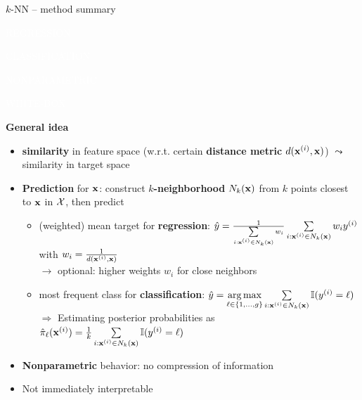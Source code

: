 \documentclass[11pt,compress,t,notes=noshow, xcolor=table]{beamer}
\newcommand{\highlight}[1]{\textcolor{hlcol}{\textbf{#1}}}
\newcommand{\maketag}[2][100]{
  \colorbox{hlcol!#1}{\textcolor{white}{\MakeUppercase{\scriptsize #2}} 
  \vphantom{}}
}
\begin{document}
\begin{frame2}{$k$-NN -- method summary}

  \maketag{regression} \maketag{classification}
  \maketag{Nonparametric} \maketag[50]{White-box}

  \highlight{General idea}
  \begin{itemize}
    \item \textbf{similarity} in feature space (w.r.t. certain \textbf{distance metric} $d(\mathbf{x}^{(i)},\mathbf{x})$) $\leadsto$ similarity in target space 
    \item \textbf{Prediction} for $\mathbf{x}$: construct \textbf{$k$-neighborhood} 
    $N_k(\mathbf{x})$ from $k$ points closest to $\mathbf{x}$ in $\mathcal{X}$, then 
    predict
    \begin{itemize}
      \footnotesize
      \item (weighted) mean target for \textbf{regression}: 
      $\hat{y} = \tfrac{1}{\sum\limits_{i: \mathbf{x}^{(i)} \in N_k(\mathbf{x})} w_i}  
      \sum\limits_{i: \mathbf{x}^{(i)} \in N_k(\mathbf{x})} w_i y^{(i)} $ with $w_i = \tfrac{1}{d(\mathbf{x}^{(i)},\mathbf{x})}$\\
      $\rightarrow$ optional: higher weights $w_i$ for close neighbors
      \item most frequent class for \textbf{classification}: 
      $\hat{y} = \underset{\ell \in \{1, \ldots, g\}}{\mathrm{\mathop{\mathrm{arg\,max}}}} \sum\limits_{i: \mathbf{x}^{(i)} \in N_k(\mathbf{x})} \mathbb{I}(y^{(i)} = \ell)$\\
      $\Rightarrow$ Estimating posterior probabilities as $\hat{\pi}_{\ell}(\mathbf{x}^{(i)})= \frac{1}{k} \sum\limits_{i: \mathbf{x}^{(i)} \in N_k(\mathbf{x})} \mathbb{I}(y^{(i)} = \ell)$
    \end{itemize}
    \item \textbf{Nonparametric} behavior: no 
    compression of information
    \item Not immediately interpretable
  \end{itemize}

\end{frame2}
\end{document}
